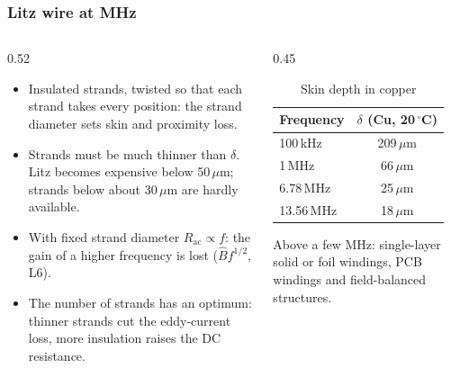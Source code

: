 \begin{frame}
	\frametitle{Litz wire at MHz}
	\begin{columns}[T]
		\begin{column}{0.52\textwidth}
			\small
			\begin{itemize}
				\item Insulated strands, twisted so that each strand takes every position: the strand diameter sets skin and proximity loss.
				\item Strands must be much thinner than $\delta$. Litz becomes expensive below 50\,$\mu$m; strands below about 30\,$\mu$m are hardly available.
				\item With fixed strand diameter $R_\mathrm{ac}\propto f$: the gain of a higher frequency is lost ($\hat{B}f^{1/2}$, L6).
				\item The number of strands has an optimum: thinner strands cut the eddy-current loss, more insulation raises the DC resistance.
			\end{itemize}
		\end{column}
		\begin{column}{0.45\textwidth}
			\begin{table}
				\centering
				\footnotesize
				\begin{tabular}{|l|c|}
					\hline
					\textbf{Frequency} & $\delta$ (Cu, 20\,$^\circ$C) \\
					\hline
					100\,kHz           & 209\,$\mu$m                 \\
					1\,MHz             & 66\,$\mu$m                  \\
					6.78\,MHz          & 25\,$\mu$m                  \\
					13.56\,MHz         & 18\,$\mu$m                  \\
					\hline
				\end{tabular}
				\caption{Skin depth in copper}
			\end{table}
			\small
			Above a few MHz: single-layer solid or foil windings, PCB windings and field-balanced structures.
		\end{column}
	\end{columns}
\end{frame}

